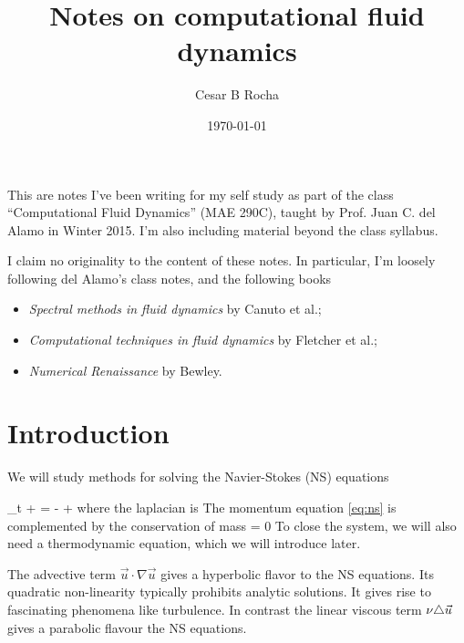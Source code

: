 \documentclass[11pt]{article}
\title{Notes on computational fluid dynamics}
\author{Cesar B Rocha}
\date{\today}
\begin{document}


\maketitle

This are notes I've been writing for my self study as part of the class ``Computational Fluid Dynamics'' (MAE 290C), taught by Prof. Juan C. del Alamo in Winter 2015. I'm also including material beyond the class syllabus.


I claim no originality to the content of these notes.  In particular, I'm loosely following del Alamo's class notes, and the following books

\begin{itemize}

    \item \textit{Spectral methods in fluid dynamics} by Canuto et al.;

    \item \textit{Computational techniques in fluid dynamics} by Fletcher et al.;

    \item \textit{Numerical Renaissance} by Bewley.

\end{itemize}

\section{Introduction}
We will study methods for solving  the Navier-Stokes (NS) equations

\beq
\label{eq:ns}
\p_t  + \cdot \nabla {} = - + \nu \lap {}\com
\eeq
where the laplacian is
\beq
\label{eq:lap_defn}
\lap {} \nabla \cdot \nabla
\eeq
The momentum equation \eqref{eq:ns} is complemented by the conservation of mass
\beq
\label{eq:cons_mass}
\nabla\cdot{} = 0\per
\eeq
To close the system, we will also need a thermodynamic equation, which we will introduce later.

The advective term $\vec{u}\cdot\nabla\vec{u}$ gives a hyperbolic flavor to the NS equations. Its quadratic non-linearity typically prohibits analytic solutions. It gives rise to fascinating phenomena like turbulence. In contrast the linear viscous term $\nu\triangle\vec{u}$ gives a parabolic flavour the NS equations.
\end{document}
